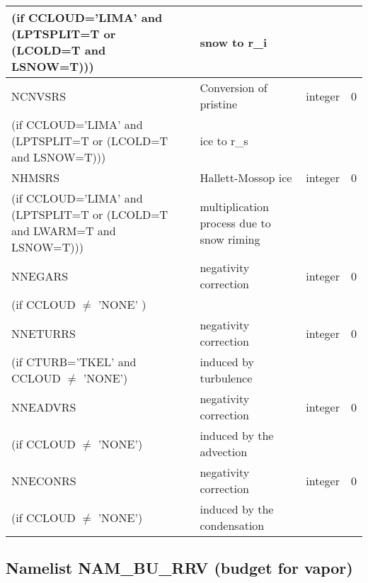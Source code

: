 \begin{longtable} {|p{}|p{}|>{\centering}p{}|p{}<{\centering}|}
(if CCLOUD='LIMA' and (LPTSPLIT=T or (LCOLD=T and LSNOW=T))) & snow to r\_i&   &  \\\hline
NCNVSRS  & Conversion of pristine  & integer  &  0 \index{NCNVSRS!\innam{NAM\_BU\_RRS}}\\ \nopagebreak
(if CCLOUD='LIMA' and (LPTSPLIT=T or (LCOLD=T and LSNOW=T))) & ice to r\_s &   &  \\\hline
NHMSRS  &Hallett-Mossop ice  & integer  &  0 \index{NHMSRS!\innam{NAM\_BU\_RRS}}\\ \nopagebreak
(if CCLOUD='LIMA' and (LPTSPLIT=T or (LCOLD=T and LWARM=T and LSNOW=T))) & multiplication process due to snow riming &   &  \\\hline
NNEGARS   & negativity correction & integer  &  0 \index{NNEGARS!\innam{NAM\_BU\_RRS}}\\ \nopagebreak
(if CCLOUD $\neq$ 'NONE' )& &   &  \\\hline
NNETURRS  &negativity correction   & integer  &  0 \index{NNETURRS!\innam{NAM\_BU\_RRS}}\\ \nopagebreak
(if CTURB='TKEL' and CCLOUD $\neq$ 'NONE')   &induced by turbulence   &       &   \\\hline
NNEADVRS  & negativity correction  & integer  &  0 \index{NNEADVRS!\innam{NAM\_BU\_RRS}}\\ \nopagebreak
(if CCLOUD $\neq$ 'NONE') & induced by the advection&   &  \\\hline
NNECONRS  &negativity correction    & integer  &  0 \index{NNECONRS!\innam{NAM\_BU\_RRS}}\\ \nopagebreak
(if CCLOUD $\neq$ 'NONE') &induced by the condensation &   &  \\\hline
\end{longtable}

\subsection{Namelist NAM\_BU\_RRV (budget for  vapor)}

